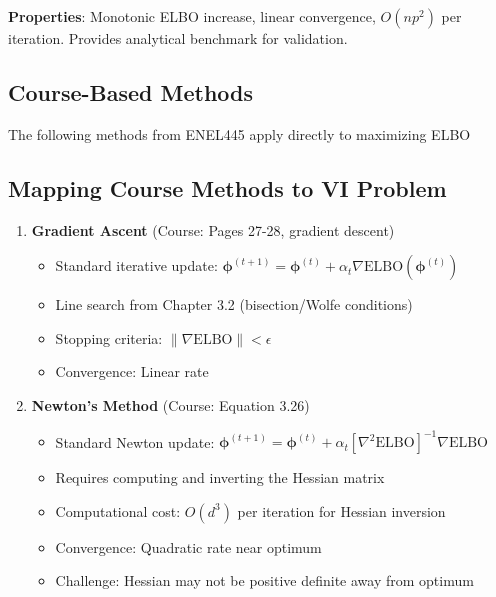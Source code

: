 \documentclass[11pt]{article}
\newcommand{\ELBO}{\text{ELBO}}
\begin{document}
\textbf{Properties}: Monotonic ELBO increase, linear convergence, $O(np^2)$ per iteration. Provides analytical benchmark for validation.

\subsection{Course-Based Methods}

The following methods from ENEL445 apply directly to maximizing ELBO

\subsection{Mapping Course Methods to VI Problem}

\begin{enumerate}[leftmargin=*]
\item \textbf{Gradient Ascent} (Course: Pages 27-28, gradient descent)
\begin{itemize}
\item Standard iterative update: $\bm{\phi}^{(t+1)} = \bm{\phi}^{(t)} + \alpha_t \nabla \ELBO(\bm{\phi}^{(t)})$
\item Line search from Chapter 3.2 (bisection/Wolfe conditions)
\item Stopping criteria: $\|\nabla \ELBO\| < \epsilon$
\item Convergence: Linear rate
\end{itemize}

\item \textbf{Newton's Method} (Course: Equation 3.26)
\begin{itemize}
\item Standard Newton update: $\bm{\phi}^{(t+1)} = \bm{\phi}^{(t)} + \alpha_t [\nabla^2 \ELBO]^{-1} \nabla \ELBO$
\item Requires computing and inverting the Hessian matrix
\item Computational cost: $O(d^3)$ per iteration for Hessian inversion
\item Convergence: Quadratic rate near optimum
\item Challenge: Hessian may not be positive definite away from optimum
\end{itemize}


\end{enumerate}
\end{document}
